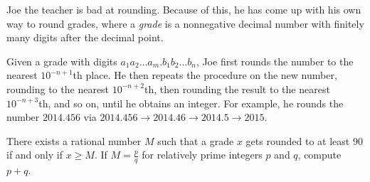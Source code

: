 Joe the teacher is bad at rounding. Because of this, he has come up with his own way to round grades, where a \emph{grade} is a nonnegative decimal number with finitely many digits after the decimal point.

Given a grade with digits $a_1a_2 \dots a_m.b_1b_2 \dots b_n$, Joe first rounds the number to the nearest $10^{-n+1}$th place. He then repeats the procedure on the new number, rounding to the nearest $10^{-n+2}$th, then rounding the result to the nearest $10^{-n+3}$th, and so on, until he obtains an integer.  For example, he rounds the number $2014.456$ via $2014.456 \to 2014.46 \to 2014.5 \to 2015$.

There exists a rational number $M$ such that a grade $x$ gets rounded to at least $90$ if and only if $x \ge M$.  If $M = \tfrac pq$ for relatively prime integers $p$ and $q$, compute $p+q$.
